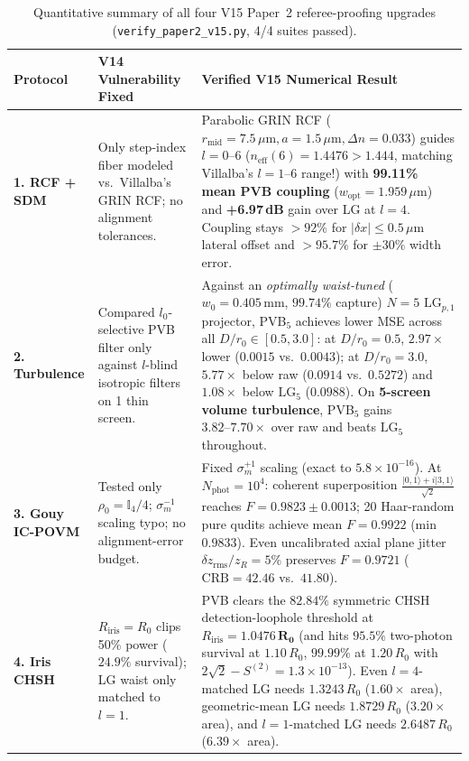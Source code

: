 \documentclass[10pt,letterpaper]{article}
\newcommand{\abs}[1]{\lvert #1 \rvert}
\newcommand{\ket}[1]{\lvert #1 \rangle}
\begin{document}
\begin{table}[t]
\centering
\caption{Quantitative summary of all four V15 Paper~2 referee-proofing upgrades (\texttt{verify\_paper2\_v15.py}, 4/4 suites passed).}
\label{tab:p2_results}
\scriptsize
\renewcommand{\arraystretch}{1.14}
\begin{tabularx}{\linewidth}{@{}l>{\raggedright\arraybackslash}p{4.5cm}>{\raggedright\arraybackslash}X@{}}
\toprule
\textbf{Protocol} & \textbf{V14 Vulnerability Fixed} & \textbf{Verified V15 Numerical Result} \\
\midrule
\textbf{1. RCF + SDM} & Only step-index fiber modeled vs.\ Villalba's GRIN RCF; no alignment tolerances. & Parabolic GRIN RCF ($r_{\mathrm{mid}}=7.5\,\mu\mathrm{m}, a=1.5\,\mu\mathrm{m}, \Delta n=0.033$) guides $l=0\text{--}6$ ($n_{\mathrm{eff}}(6)=1.4476 > 1.444$, matching Villalba's $l=1\text{--}6$ range!) with \textbf{99.11\% mean PVB coupling} ($w_{\mathrm{opt}}=1.959\,\mu\mathrm{m}$) and \textbf{+6.97\,dB} gain over LG at $l=4$. Coupling stays $>92\%$ for $\abs{\delta x}\le 0.5\,\mu\mathrm{m}$ lateral offset and $>95.7\%$ for $\pm 30\%$ width error. \\
\textbf{2. Turbulence} & Compared $l_0$-selective PVB filter only against $l$-blind isotropic filters on 1 thin screen. & Against an \emph{optimally waist-tuned} ($w_0=0.405\,\mathrm{mm}$, $99.74\%$ capture) $N=5$ $\mathrm{LG}_{p,1}$ projector, PVB$_5$ achieves lower MSE across all $D/r_0\in[0.5,3.0]$: at $D/r_0=0.5$, $2.97\times$ lower ($0.0015$ vs.\ $0.0043$); at $D/r_0=3.0$, $5.77\times$ below raw ($0.0914$ vs.\ $0.5272$) and $1.08\times$ below $\mathrm{LG}_5$ ($0.0988$). On \textbf{5-screen volume turbulence}, PVB$_5$ gains $3.82\text{--}7.70\times$ over raw and beats $\mathrm{LG}_5$ throughout. \\
\textbf{3. Gouy IC-POVM} & Tested only $\rho_0 = \mathbb{I}_4/4$; $\sigma_m^{-1}$ scaling typo; no alignment-error budget. & Fixed $\sigma_m^{+1}$ scaling (exact to $5.8\times 10^{-16}$). At $N_{\mathrm{phot}}=10^4$: coherent superposition $\frac{\ket{0,1}+i\ket{3,1}}{\sqrt{2}}$ reaches $F = \mathbf{0.9823\pm 0.0013}$; 20 Haar-random pure qudits achieve mean $F = \mathbf{0.9922}$ (min $0.9833$). Even uncalibrated axial plane jitter $\delta z_{\mathrm{rms}}/z_R = 5\%$ preserves $F = 0.9721$ ($\mathrm{CRB}=42.46$ vs.\ $41.80$). \\
\textbf{4. Iris CHSH} & $R_{\mathrm{iris}}=R_0$ clips 50\% power ($24.9\%$ survival); LG waist only matched to $l=1$. & PVB clears the $82.84\%$ symmetric CHSH detection-loophole threshold at $R_{\mathrm{iris}}=\mathbf{1.0476\,R_0}$ (and hits $95.5\%$ two-photon survival at $1.10\,R_0$, $99.99\%$ at $1.20\,R_0$ with $2\sqrt{2}-S^{(2)} = 1.3\times 10^{-13}$). Even $l=4$-matched LG needs $1.3243\,R_0$ ($1.60\times$ area), geometric-mean LG needs $1.8729\,R_0$ ($3.20\times$ area), and $l=1$-matched LG needs $2.6487\,R_0$ ($6.39\times$ area). \\
\bottomrule
\end{tabularx}
\end{table}
\end{document}
